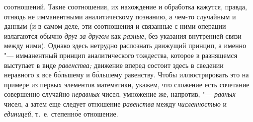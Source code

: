 соотношений. Такие соотношения, их нахождение и обработка кажутся, правда,
отнюдь не имманентными аналитическому познанию, а чем-то
случайным и данным (и в самом деле, эти соотношения и связанные с ними
операции излагаются обычно {\em друг за другом} как {\em разные}, без
указания внутренней связи между ними). Однако здесь нетрудно распознать
движущий принцип, а именно "--- имманентный принцип
аналитического тождества, которое в разнящемся выступает в виде
{\em равенства;} движение
вперед состоит здесь в сведении неравного к все б\'{о}льшему и б\'{о}льшему
равенству. Чтобы иллюстрировать это на примере из первых элементов
математики, укажем, что сложение есть сочетание совершенно случайно
{\em неравных} чисел, умножение же, напротив, "--- {\em равных}
чисел, а затем еще следует отношение {\em равенства} между {\em численностью}
и {\em единицей}, т.~е. степенн\'{о}е отношение.

